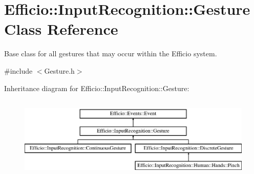 \hypertarget{class_efficio_1_1_input_recognition_1_1_gesture}{}\section{Efficio\+:\+:Input\+Recognition\+:\+:Gesture Class Reference}
\label{class_efficio_1_1_input_recognition_1_1_gesture}


Base class for all gestures that may occur within the Efficio system.  




{\ttfamily \#include $<$Gesture.\+h$>$}

Inheritance diagram for Efficio\+:\+:Input\+Recognition\+:\+:Gesture\+:\begin{figure}[H]
\begin{center}
\leavevmode
\includegraphics[height=4.000000cm]{class_efficio_1_1_input_recognition_1_1_gesture}
\end{center}
\end{figure}
